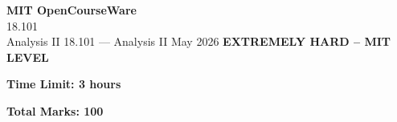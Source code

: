 \documentclass[12pt,a4paper]{exam}
\begin{document}
\begin{center}
{\LARGE \textbf{MIT OpenCourseWare}}\\18.101\\Analysis II
\vspace{0.5cm}
{18.101} --- {Analysis II}
\vspace{0.3cm}
May 2026
\vspace{0.3cm}
\textbf{EXTREMELY HARD -- MIT LEVEL}
\end{center}

\begin{center}
\textbf{Time Limit: 3 hours}
\end{center}

\begin{center}
\textbf{Total Marks: 100}
\end{center}

\vspace{0.5cm}
\end{document}

